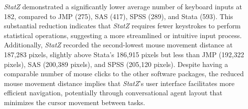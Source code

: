\documentclass{article}
\begin{document}
\textit{StatZ} demonstrated a significantly lower average number of keyboard inputs at 182, compared to JMP (275), SAS (417), SPSS (289), and Stata (593). This substantial reduction indicates that \textit{StatZ} requires fewer keystrokes to perform statistical operations, suggesting a more streamlined or intuitive input process. Additionally, \textit{StatZ} recorded the second-lowest mouse movement distance at 187,283 pixels, slightly above Stata's 186,915 pixels but less than JMP (192,322 pixels), SAS (200,389 pixels), and SPSS (205,120 pixels). Despite having a comparable number of mouse clicks to the other software packages, the reduced mouse movement distance implies that \textit{StatZ}'s user interface facilitates more efficient navigation, potentially through conversational agent layout that minimizes the cursor movement between tasks.
\end{document}
